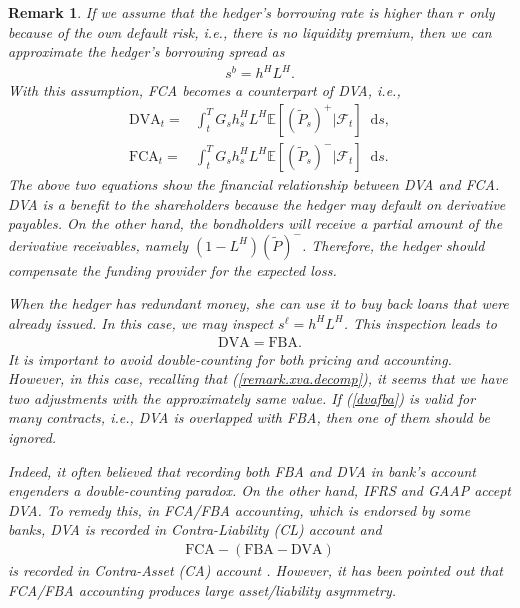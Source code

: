 \documentclass[a4paper, 11pt]{article}              %
\numberwithin{equation}{section}
\theoremstyle{plain}
\newcommand{\1}{\mathds{1}}
\newcommand{\calF}{\mathcal{F}}
\newcommand{\pt}{\tilde{P}}
\newcommand{\dsE}{\mathbb{E}}
\theoremstyle{plain}
\theoremstyle{definition}
\newtheorem{remark}[thm]{Remark} %
\theoremstyle{plain}
\newtheorem{remark}{Remark}
\newcommand*\df{\mathop{}\!\mathrm{d}}
\begin{document}
\begin{remark}
If we assume that the hedger's borrowing rate is higher than $r$ only because of
the own default risk, i.e., there is no liquidity premium, then we can
approximate the hedger's borrowing spread as
\begin{align}
  s^b = h^HL^H. \nonumber  
\end{align}
With this assumption, FCA becomes a counterpart of DVA, i.e.,
\begin{align}
 \text{DVA}_t=& \int_{t}^{T}G_sh^H_sL^H\dsE[(\pt_s)^+|\calF_t] \df s,\label{remark:dva}\\
 \text{FCA}_t=& \int_{t}^{T}G_sh^H_sL^H\dsE[(\pt_s)^-|\calF_t] \df s. 
\end{align}
The above two equations show the financial relationship between DVA and
FCA. DVA is a benefit to the shareholders because the hedger may default on
derivative payables. On the other hand, the bondholders will receive a partial
amount of the derivative receivables, namely $(1-L^H)(\pt)^-$. Therefore, the
hedger should compensate the funding provider for the expected loss.

When the hedger has redundant money, she can use it to buy back loans that were 
already issued. In this case, we may inspect $s^\ell = h^HL^H$. This
inspection leads to
\begin{align}
  \text{DVA} = \text{FBA}.   \label{dvafba}
\end{align}
It is important to avoid double-counting for both pricing and accounting.
However, in this case, recalling that (\ref{remark.xva.decomp}), it seems that
we have 
two adjustments with the approximately same value. If (\ref{dvafba}) is valid
for many contracts, i.e., DVA is overlapped with FBA, then one of them should be
ignored.

Indeed, it often believed that recording both FBA and DVA in bank's account
engenders a double-counting paradox. On the other hand, IFRS and GAAP accept
DVA. To remedy this, in FCA/FBA accounting, which is endorsed by some banks, DVA
is recorded in Contra-Liability (CL) account and
  \begin{align}
    \text{FCA} - (\text{FBA} -\text{DVA})    \nonumber 
  \end{align}
  is recorded in Contra-Asset (CA) account \citep[see][]{castagna2011funding,
    albanese2014accounting}. However, it has been pointed out
  that FCA/FBA accounting produces large asset/liability asymmetry.



\end{remark}
\end{document}
